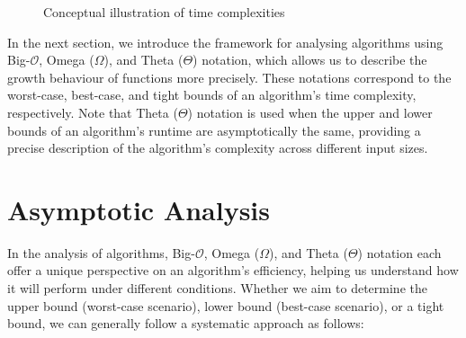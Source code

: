\begin{figure}[h]
    \centering
    \caption{Conceptual illustration of time complexities}
    \label{fig:time_complexities}
\end{figure}

In the next section, we introduce the framework for analysing algorithms using Big-$\mathcal{O}$, Omega ($\Omega$), and Theta ($\Theta$) notation, which allows us to describe the growth behaviour of functions more precisely. These notations correspond to the worst-case, best-case, and tight bounds of an algorithm's time complexity, respectively. Note that Theta ($\Theta$) notation is used when the upper and lower bounds of an algorithm's runtime are asymptotically the same, providing a precise description of the algorithm's complexity across different input sizes.


\section{Asymptotic Analysis}
In the analysis of algorithms, Big-$\mathcal{O}$, Omega ($\Omega$), and Theta ($\Theta$) notation each offer a unique perspective on an algorithm's efficiency, helping us understand how it will perform under different conditions. Whether we aim to determine the upper bound (worst-case scenario), lower bound (best-case scenario), or a tight bound, we can generally follow a systematic approach as follows:

